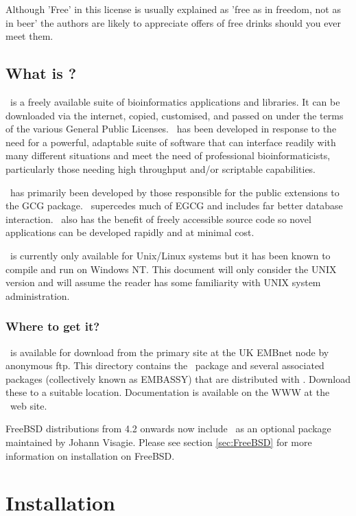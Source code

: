 \documentclass{report}
\begin{document}
Although 'Free' in this license is usually explained as 'free as in
freedom, not as in beer' the authors are likely to appreciate offers
of free drinks should you ever meet them.
\section{What is \EMBOSS?}

\EMBOSS\ is a freely available suite of bioinformatics applications
and libraries. It can be downloaded via the internet, copied,
customised, and passed on under the terms of the various General
Public Licenses.  \EMBOSS\ has been developed in response to the need
for a powerful, adaptable suite of software that can interface readily
with many different situations and meet the need of professional
bioinformaticists, particularly those needing high throughput and/or
scriptable capabilities.

\EMBOSS\ has primarily been developed by those responsible for the
public extensions to the GCG package. \EMBOSS\ supercedes much of EGCG
and includes far better database interaction. \EMBOSS\ also has the
benefit of freely accessible source code so novel applications can be
developed rapidly and at minimal cost.

\EMBOSS\ is currently only available for Unix/Linux systems but it has
been known to compile and run on Windows NT. This document will only
consider the UNIX version and will assume the reader has some
familiarity with UNIX system administration.

\subsection{Where to get it?}

\EMBOSS\ is available for download from the primary site at the UK
EMBnet node by anonymous ftp. This
directory contains the \EMBOSS\ package and several associated
packages (collectively known as EMBASSY) that are distributed with
\EMBOSS. Download these to a suitable location. Documentation is
available on the WWW at the \EMBOSS\ web
site.

FreeBSD distributions from 4.2 onwards now include \EMBOSS\ as an
optional package maintained by Johann
Visagie. Please see section
\ref{sec:FreeBSD} for more information on installation on FreeBSD.

\chapter{Installation}
\end{document}
